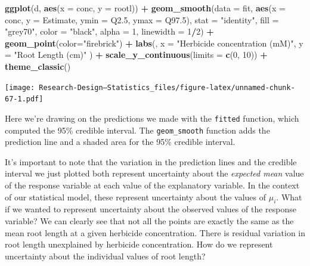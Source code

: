 \documentclass[
]{book}
\newenvironment{Shaded}{\begin{snugshade}}{\end{snugshade}}
\newcommand{\AttributeTok}[1]{\textcolor[rgb]{0.13,0.29,0.53}{#1}}
\newcommand{\DecValTok}[1]{\textcolor[rgb]{0.00,0.00,0.81}{#1}}
\newcommand{\FloatTok}[1]{\textcolor[rgb]{0.00,0.00,0.81}{#1}}
\newcommand{\FunctionTok}[1]{\textcolor[rgb]{0.13,0.29,0.53}{\textbf{#1}}}
\newcommand{\NormalTok}[1]{#1}
\newcommand{\SpecialCharTok}[1]{\textcolor[rgb]{0.81,0.36,0.00}{\textbf{#1}}}
\newcommand{\StringTok}[1]{\textcolor[rgb]{0.31,0.60,0.02}{#1}}
\begin{document}
\begin{Shaded}
\begin{Highlighting}[]
\FunctionTok{ggplot}\NormalTok{(d, }\FunctionTok{aes}\NormalTok{(}\AttributeTok{x =}\NormalTok{ conc, }\AttributeTok{y =}\NormalTok{ rootl)) }\SpecialCharTok{+}
  \FunctionTok{geom\_smooth}\NormalTok{(}\AttributeTok{data =}\NormalTok{ fit,}
              \FunctionTok{aes}\NormalTok{(}\AttributeTok{x =}\NormalTok{ conc, }\AttributeTok{y =}\NormalTok{ Estimate, }\AttributeTok{ymin =}\NormalTok{ Q2}\FloatTok{.5}\NormalTok{, }\AttributeTok{ymax =}\NormalTok{ Q97}\FloatTok{.5}\NormalTok{),}
              \AttributeTok{stat =} \StringTok{"identity"}\NormalTok{,}
              \AttributeTok{fill =} \StringTok{"grey70"}\NormalTok{, }\AttributeTok{color =} \StringTok{"black"}\NormalTok{, }\AttributeTok{alpha =} \DecValTok{1}\NormalTok{, }\AttributeTok{linewidth =} \DecValTok{1}\SpecialCharTok{/}\DecValTok{2}\NormalTok{) }\SpecialCharTok{+}
  \FunctionTok{geom\_point}\NormalTok{(}\AttributeTok{color=}\StringTok{"firebrick"}\NormalTok{) }\SpecialCharTok{+}
  \FunctionTok{labs}\NormalTok{(,}
    \AttributeTok{x =} \StringTok{"Herbicide concentration (mM)"}\NormalTok{,}
    \AttributeTok{y =} \StringTok{"Root Length (cm)"}
\NormalTok{  ) }\SpecialCharTok{+}
  \FunctionTok{scale\_y\_continuous}\NormalTok{(}\AttributeTok{limits =} \FunctionTok{c}\NormalTok{(}\DecValTok{0}\NormalTok{, }\DecValTok{10}\NormalTok{)) }\SpecialCharTok{+} 
  \FunctionTok{theme\_classic}\NormalTok{()}
\end{Highlighting}
\end{Shaded}

\texttt{[image: Research-Design---Statistics\_files/figure-latex/unnamed-chunk-67-1.pdf]}

Here we're drawing on the predictions we made with the \texttt{fitted} function, which computed the 95\% credible interval. The \texttt{geom\_smooth} function adds the prediction line and a shaded area for the 95\% credible interval.

It's important to note that the variation in the prediction lines and the credible interval we just plotted both represent uncertainty about the \emph{expected mean} value of the response variable at each value of the explanatory variable. In the context of our statistical model, these represent uncertainty about the values of \(\mu_i\). What if we wanted to represent uncertainty about the observed values of the response variable? We can clearly see that not all the points are exactly the same as the mean root length at a given herbicide concentration. There is residual variation in root length unexplained by herbicide concentration. How do we represent uncertainty about the individual values of root length?
\end{document}

